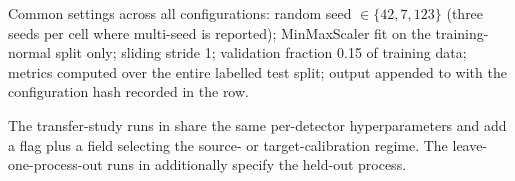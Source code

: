 Common settings across all configurations: random seed $\in\{42, 7, 123\}$ (three seeds per cell where multi-seed is reported); MinMaxScaler fit on the training-normal split only; sliding stride 1; validation fraction 0.15 of training data; metrics computed over the entire labelled test split; output appended to  with the configuration hash recorded in the row.

The transfer-study runs in  share the same per-detector hyperparameters and add a  flag plus a  field selecting the source- or target-calibration regime.  The leave-one-process-out runs in  additionally specify the held-out process.
